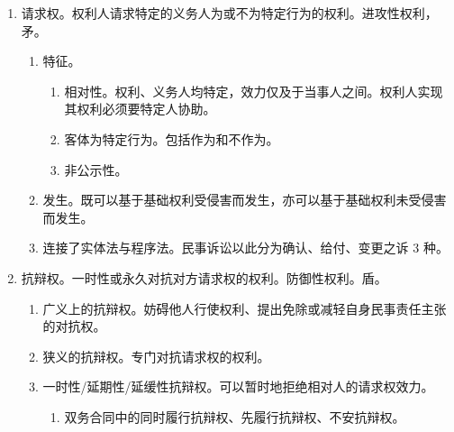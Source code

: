 \begin{enumerate}
\begin{enumerate}
\begin{enumerate}
\begin{enumerate}
                          \item 明示和默示。。
                          \item 是否需要特定形式行使。简单形成权/单纯形成权 \yjt 单方意思表示即可发生效力。。
                        \end{enumerate}
                  \item 9 类典型形成权。撤、抵、追、解；否、选、继、赠。
                        撤销权、（法定）抵销权、追认权、解除权、否认权、选择权、继承人沉默接受继承、受遗赠人沉默放弃受遗赠。
                  \item 适用除斥期间限制，而非诉讼时效限制。
                \end{enumerate}
          \item 请求权。权利人请求特定的义务人为或不为特定行为的权利。进攻性权利，矛。
                \begin{enumerate}
                  \item 特征。
                        \begin{enumerate}
                          \item 相对性。权利、义务人均特定，效力仅及于当事人之间。权利人实现其权利必须要特定人协助。
                          \item 客体为特定行为。包括作为和不作为。
                          \item 非公示性。
                        \end{enumerate}
                  \item 发生。既可以基于基础权利受侵害而发生，亦可以基于基础权利未受侵害而发生。
                  \item 连接了实体法与程序法。民事诉讼以此分为确认、给付、变更之诉 3 种。
                \end{enumerate}
          \item 抗辩权。一时性或永久对抗对方请求权的权利。防御性权利。盾。
                \begin{enumerate}
                  \item 广义上的抗辩权。妨碍他人行使权利、提出免除或减轻自身民事责任主张的对抗权。
                  \item 狭义的抗辩权。专门对抗请求权的权利。
                  \item 一时性/延期性/延缓性抗辩权。可以暂时地拒绝相对人的请求权效力。
                        \begin{enumerate}
                          \item 双务合同中的同时履行抗辩权、先履行抗辩权、不安抗辩权。

\end{enumerate}
\end{enumerate}
\end{enumerate}
\end{enumerate}
